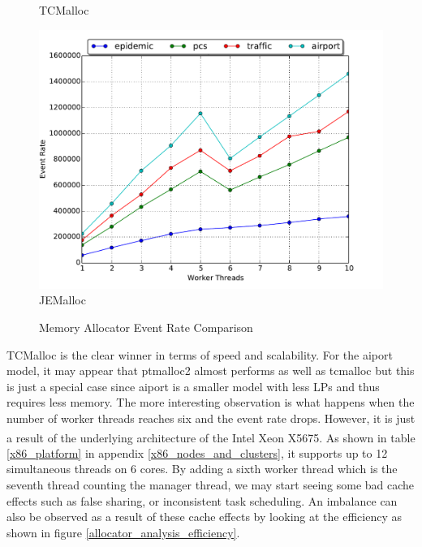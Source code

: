 \documentclass[11pt]{book}
\begin{document}
\begin{figure}
\begin{minipage}{.5\textwidth}
\begin{center}
      TCMalloc \\
    \end{center}
  \end{minipage}
  \centering
  \begin{minipage}{.5\textwidth}
    \begin{center}
      \includegraphics[width=\textwidth,keepaspectratio,quiet]{figs/memory_allocation/jemalloc_eventrate.pdf} \\
      JEMalloc \\
    \end{center}
  \end{minipage}
  \caption{Memory Allocator Event Rate Comparison}\label{allocator_analysis_eventrate}
\end{figure}

TCMalloc is the clear winner in terms of speed and scalability.  For the aiport model, it may
appear that ptmalloc2 almost performs as well as tcmalloc but this is just a special case since
aiport is a smaller model with less LPs and thus requires less memory.  The more interesting
observation is what happens when the number of worker threads reaches six and the event rate
drops.  However, it is just a result of the underlying architecture of the
Intel\textsuperscript{\textregistered} Xeon\textsuperscript{\textregistered} X5675.  As shown in
table \ref{x86_platform} in appendix \ref{x86_nodes_and_clusters}, it supports up to 12 simultaneous
threads on 6 cores.  By adding a sixth worker thread which is the seventh thread counting the
manager thread, we may start seeing some bad cache effects such as false sharing, or inconsistent
task scheduling.  An imbalance can also be observed as a result of these cache effects by looking at
the efficiency as shown in figure \ref{allocator_analysis_efficiency}.
\end{document}
